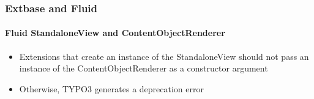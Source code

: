 %

\begin{frame}[fragile]
	\frametitle{Extbase and Fluid}
	\framesubtitle{Fluid StandaloneView and ContentObjectRenderer}


	\begin{itemize}
		\item Extensions that create an instance of the StandaloneView
			should not pass an instance of the ContentObjectRenderer as a
			constructor argument
		\item Otherwise, TYPO3 generates a deprecation error
	\end{itemize}

\end{frame}

